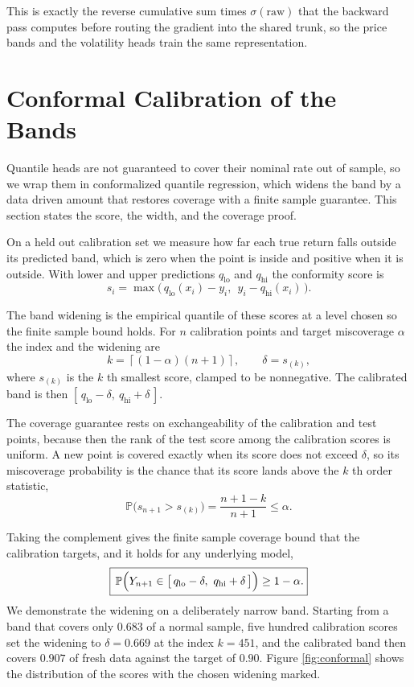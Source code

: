 \documentclass[12pt,letterpaper]{article}
\begin{document}
This is exactly the reverse cumulative sum times $\sigma(\text{raw})$ that the
backward pass computes before routing the gradient into the shared trunk, so the
price bands and the volatility heads train the same representation.

\clearpage
\section{Conformal Calibration of the Bands}

Quantile heads are not guaranteed to cover their nominal rate out of sample, so
we wrap them in conformalized quantile regression, which widens the band by a
data driven amount that restores coverage with a finite sample guarantee. This
section states the score, the width, and the coverage proof.

On a held out calibration set we measure how far each true return falls outside
its predicted band, which is zero when the point is inside and positive when it
is outside. With lower and upper predictions $q_{\text{lo}}$ and $q_{\text{hi}}$
the conformity score is
\[
s_i = \max\bigl(\,q_{\text{lo}}(x_i) - y_i,\ \ y_i - q_{\text{hi}}(x_i)\,\bigr).
\]

The band widening is the empirical quantile of these scores at a level chosen so
the finite sample bound holds. For $n$ calibration points and target miscoverage
$\alpha$ the index and the widening are
\[
k = \left\lceil (1-\alpha)(n+1) \right\rceil,
\qquad
\delta = s_{(k)},
\]
where $s_{(k)}$ is the $k$ th smallest score, clamped to be nonnegative. The
calibrated band is then $[\,q_{\text{lo}} - \delta,\ q_{\text{hi}} + \delta\,]$.

The coverage guarantee rests on exchangeability of the calibration and test
points, because then the rank of the test score among the calibration scores is
uniform. A new point is covered exactly when its score does not exceed $\delta$,
so its miscoverage probability is the chance that its score lands above the $k$
th order statistic,
\[
\mathbb{P}\bigl(s_{n+1} > s_{(k)}\bigr) = \frac{n + 1 - k}{n + 1}
\le \alpha .
\]

Taking the complement gives the finite sample coverage bound that the
calibration targets, and it holds for any underlying model,
\[
\boxed{\,\mathbb{P}\Bigl(Y_{n+1} \in \bigl[\,q_{\text{lo}} - \delta,\ q_{\text{hi}} + \delta\,\bigr]\Bigr)
\ge 1 - \alpha .}
\]
We demonstrate the widening on a deliberately narrow band. Starting from a band
that covers only $0.683$ of a normal sample, five hundred calibration scores set
the widening to $\delta = 0.669$ at the index $k = 451$, and the calibrated band
then covers $0.907$ of fresh data against the target of $0.90$. Figure
\ref{fig:conformal} shows the distribution of the scores with the chosen
widening marked.
\end{document}
